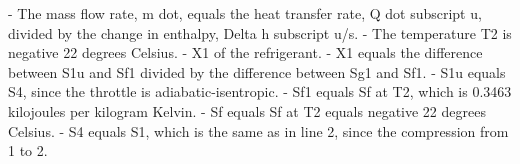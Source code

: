 - The mass flow rate, m dot, equals the heat transfer rate, Q dot subscript u, divided by the change in enthalpy, Delta h subscript u/s.
- The temperature T2 is negative 22 degrees Celsius.
- X1 of the refrigerant.
- X1 equals the difference between S1u and Sf1 divided by the difference between Sg1 and Sf1.
- S1u equals S4, since the throttle is adiabatic-isentropic.
- Sf1 equals Sf at T2, which is 0.3463 kilojoules per kilogram Kelvin.
- Sf equals Sf at T2 equals negative 22 degrees Celsius.
- S4 equals S1, which is the same as in line 2, since the compression from 1 to 2.
